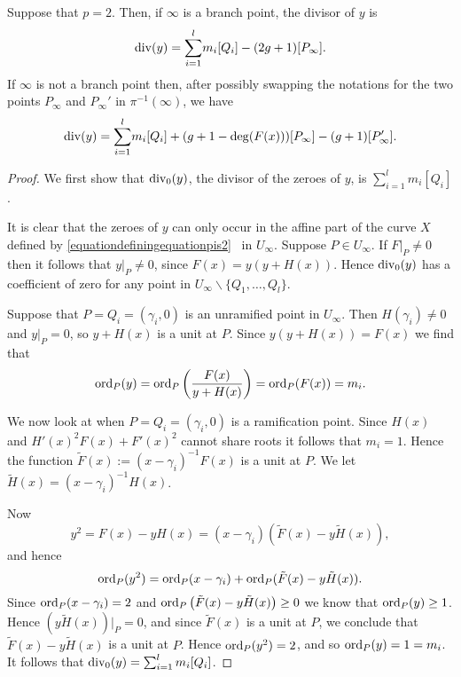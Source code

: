     \begin{prop}\label{propdivisorofypis2}
    Suppose that $p=2$.
    Then, if $\infty$ is a branch point, the divisor of $y$ is
        \begin{equation*}
        \operatorname{div}(y) = 
         {\displaystyle \sum_{i=1}^l} m_i[Q_i] -(2g+1)[P_\infty].
        \end{equation*}
    If $\infty$ is not a branch point then, after possibly swapping the notations for the two points $P_\infty$ and $P_\infty'$ in $\pi^{-1}(\infty)$, we have
        \begin{equation*}
        \operatorname{div}(y) = {\displaystyle \sum_{i=1}^l} m_i[Q_i] +(g+1-\deg(F(x)))[P_\infty] - (g+1)[P_\infty'].
        \end{equation*}
    \end{prop}
    \begin{proof}
    We first show that $\operatorname{div}_0(y)$, the divisor of the zeroes of $y$, is $\sum_{i=1}^l m_i [Q_i]$.
    
    It is clear that the zeroes of $y$ can only occur in the affine part of the curve $X$ defined by \eqref{equationdefiningequationpis2} \ie~in $U_\infty$.
    Suppose $P\in U_\infty$.
    If $\left. F \right|_P \neq 0$ then it follows that $y|_P \neq 0$, since $F(x) = y (y + H(x))$.
    Hence $\operatorname{div}_0(y)$ has a coefficient  of zero for any point in $U_\infty\backslash \{Q_1, \ldots, Q_l \}$.
    
    Suppose that $P= Q_i = (\gamma_i, 0)$ is an unramified point in $U_\infty$.
    Then $H(\gamma_i) \neq 0$ and $\left. y \right|_P = 0$, so $y + H(x)$ is a unit at $P$.
    Since $y(y+H(x)) = F(x)$ we find that
        \begin{equation*}
        \operatorname{ord}_P(y) = \operatorname{ord}_P\left( \frac{F(x)}{y + H(x)} \right) = \operatorname{ord}_P(F(x)) = m_i.
        \end{equation*}
    
    We now look at when $P = Q_i = (\gamma_i, 0)$ is a ramification point.
    Since $H(x)$ and $H'(x)^2F(x) + F'(x)^2$ cannot share roots it follows that $m_i = 1$.
    Hence the function $\tilde F(x) := (x- \gamma_i)^{-1}F(x)$ is a unit at $P$.
    We let $\tilde H(x) = (x- \gamma_i)^{-1}H(x)$.
    
    
    Now 
        \[
        y^2 = F(x) - y H(x) = (x- \gamma_i) \left(\tilde F(x) - y \tilde H(x)\right),
        \]
    and hence
        \[
        \operatorname{ord}_P(y^2 ) = \operatorname{ord}_P(x-\gamma_i) + \operatorname{ord}_P(\tilde F(x) - y \tilde H(x)).
        \]
    Since $\operatorname{ord}_P(x-\gamma_i) = 2$ and $\operatorname{ord}_P\left(\tilde F(x) - y \tilde H(x)\right) \geq 0$ we know that $\operatorname{ord}_P(y) \geq 1$.
    Hence $(y \tilde H(x)) \big|_P = 0$, and since $\tilde F(x)$ is a unit at $P$, we conclude that $\tilde F(x) - y \tilde H(x)$ is a unit at $P$.
    Hence $\operatorname{ord}_P(y^2) = 2$, and so $\operatorname{ord}_P(y) = 1 = m_i$.
    It follows that $\operatorname{div}_0(y) =  \sum_{i=1}^l m_i [Q_i]$.
    

\end{proof}

